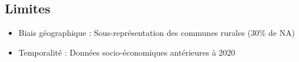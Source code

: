 \subsection{Limites}
\begin{itemize}
    \item Biais géographique : Sous-représentation des communes rurales (30\% de NA)
    \item Temporalité : Données socio-économiques antérieures à 2020
\end{itemize}
